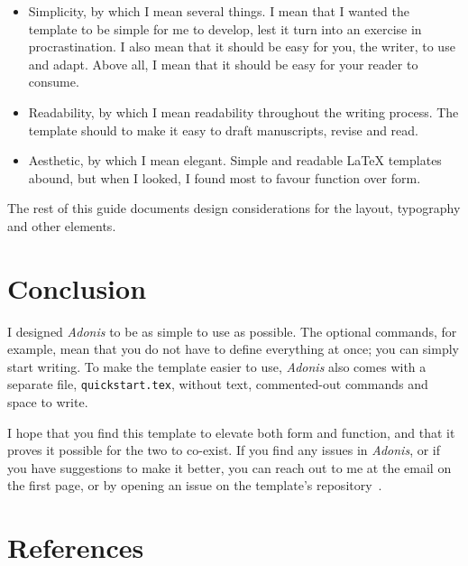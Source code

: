 \documentclass[12pt]{article}
\begin{document}
		\begin{itemize}
			\item Simplicity, by which I mean several things.
				  I mean that I wanted the template to be simple for me to develop, lest it turn into an exercise in procrastination.
				  I also mean that it should be easy for you, the writer, to use and adapt.
				  Above all, I mean that it should be easy for your reader to consume.
			
			\item Readability, by which I mean readability throughout the writing process.
				  The template should to make it easy to draft manuscripts, revise and read.
			
			\item Aesthetic, by which I mean elegant.
				  Simple and readable \LaTeX{} templates abound, but when I looked, I found most to favour function over form.
		\end{itemize}
	
		The rest of this guide documents design considerations for the layout, typography and other elements.
	
        \section{Conclusion}
		I designed \textit{Adonis} to be as simple to use as possible.
		The optional commands, for example, mean that you do not have to define everything at once; you can simply start writing.
		To make the template easier to use, \textit{Adonis} also comes with a separate file, \texttt{quickstart.tex}, without text, commented-out commands and space to write.
		
		I hope that you find this template to elevate both form and function, and that it proves it possible for the two to co-exist.
		If you find any issues in \textit{Adonis}, or if you have suggestions to make it better, you can reach out to me at the email on the first page, or by opening an issue on the template's repository~\cite{einstein}.
    
	\section{References}
	\printbibliography[heading=none]
	
\end{document}
